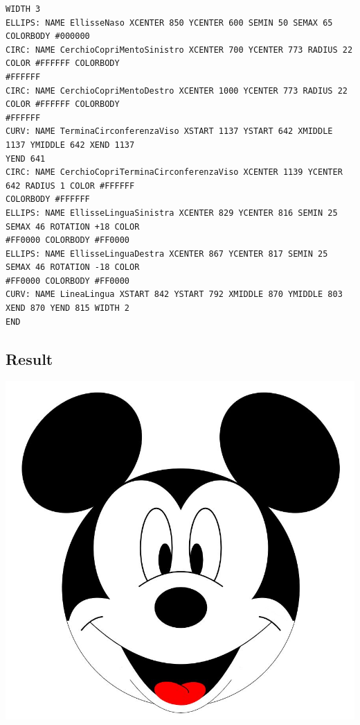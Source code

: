 \documentclass[a4paper]{article}
\begin{document}
\begin{verbatim}
WIDTH 3
ELLIPS: NAME EllisseNaso XCENTER 850 YCENTER 600 SEMIN 50 SEMAX 65 COLORBODY #000000
CIRC: NAME CerchioCopriMentoSinistro XCENTER 700 YCENTER 773 RADIUS 22 COLOR #FFFFFF COLORBODY
#FFFFFF
CIRC: NAME CerchioCopriMentoDestro XCENTER 1000 YCENTER 773 RADIUS 22 COLOR #FFFFFF COLORBODY
#FFFFFF
CURV: NAME TerminaCirconferenzaViso XSTART 1137 YSTART 642 XMIDDLE 1137 YMIDDLE 642 XEND 1137
YEND 641
CIRC: NAME CerchioCopriTerminaCirconferenzaViso XCENTER 1139 YCENTER 642 RADIUS 1 COLOR #FFFFFF
COLORBODY #FFFFFF
ELLIPS: NAME EllisseLinguaSinistra XCENTER 829 YCENTER 816 SEMIN 25 SEMAX 46 ROTATION +18 COLOR
#FF0000 COLORBODY #FF0000
ELLIPS: NAME EllisseLinguaDestra XCENTER 867 YCENTER 817 SEMIN 25 SEMAX 46 ROTATION -18 COLOR
#FF0000 COLORBODY #FF0000
CURV: NAME LineaLingua XSTART 842 YSTART 792 XMIDDLE 870 YMIDDLE 803 XEND 870 YEND 815 WIDTH 2
END
\end{verbatim}

\newpage

\subsection{Result}
\includegraphics[scale=0.76]{Topolino.JPG} 
\end{document}
